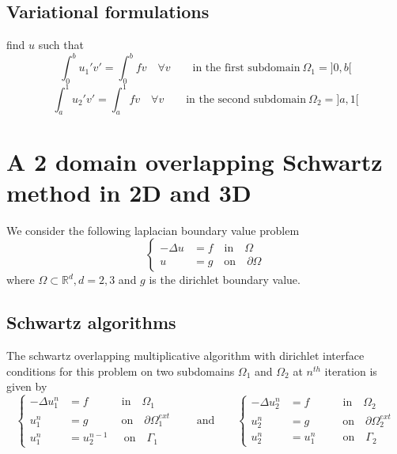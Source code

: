 \subsection{Variational formulations}
\label{sec:vari-form-1}
find $u$ such that
\begin{equation*}
  \int_0^b u_1'v' = \int_0^b fv \quad \forall v \qquad \text{in the first subdomain} ~\Omega_1 = ]0,b[
\end{equation*}
\vspace{-5pt}
\begin{equation*}
  \int_a^1 u_2'v' = \int_a^1 fv \quad \forall v \qquad \text{in the second subdomain} ~ \Omega_2 = ]a,1[
\end{equation*}

\section{A 2 domain overlapping Schwartz method in 2D and 3D}
\label{sec:2-doma-overl}

We consider the following laplacian boundary value  problem
\begin{equation}
  \left \{
    \begin{aligned}
      -\Delta u & = f \quad \text{in} \quad  \Omega \\
      u & = g \quad \text{on} \quad  \partial\Omega
    \end{aligned}
  \right.
 \label{eq:33}
\end{equation}
where $\Omega \subset \mathbb R^d, d=2,3$ and $g$ is the dirichlet boundary value.

\subsection{Schwartz algorithms}
\label{sec:schwartz-algorithms-1}
The schwartz overlapping multiplicative algorithm with dirichlet interface conditions for this problem on two subdomains $\Omega_1$
and $\Omega_2$ at $n^{th}$ iteration is given by
\begin{equation}
  \label{eq:31}
  \left \{
    \begin{aligned}
      -\Delta u_1^n & =  f \quad \qquad  \text{in}  \quad  \Omega_1  \\
       u_1^n  & =  g \quad \qquad  \text{on} \quad \partial \Omega_1^{ext}\\
       u_1^n  & = u_2^{n-1} \quad ~~  \text{on} \quad \Gamma_1
    \end{aligned}
  \right.
\qquad \text{and} \qquad
  \left \{
    \begin{aligned}
      - \Delta u_2^n & =  f \quad \qquad  \text{in}  \quad  \Omega_2  \\
      u_2^n  & =  g  \quad \qquad  \text{on} \quad \partial \Omega_2^{ext}\\
      u_2^n  & = u_1^n \qquad~~  \text{on} \quad \Gamma_2
    \end{aligned}
  \right.
\end{equation}

